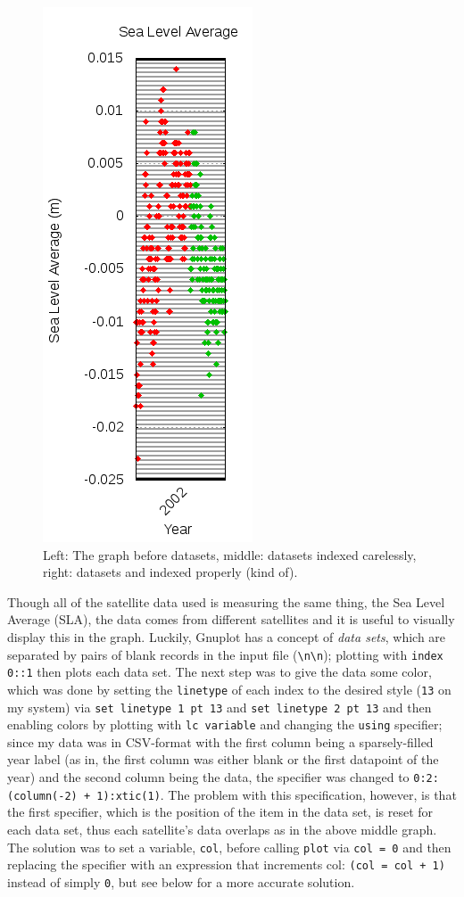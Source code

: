 \documentclass{article}
\begin{document}
\begin{figure}
\includegraphics{files/blog/2018_06_02_measuring_sea_level_averages_using_rads/2018_06_02_datasets_after.png}
\caption{Left: The graph before datasets, middle: datasets indexed carelessly, right: datasets and indexed properly (kind of).}
\end{figure}
Though all of the satellite data used is measuring the same thing, the Sea Level Average (SLA), the data comes from different satellites and it is useful to visually display this in the graph.  Luckily, Gnuplot has a concept of \emph{data sets}, which are separated by pairs of blank records in the input file (\verb$\n\n$); plotting with \texttt{index 0::1} then plots each data set.  The next step was to give the data some color, which was done by setting the \texttt{linetype} of each index to the desired style (\texttt{13} on my system) via \texttt{set linetype 1 pt 13} and \texttt{set linetype 2 pt 13} and then enabling colors by plotting with \texttt{lc variable} and changing the \texttt{using} specifier; since my data was in CSV-format with the first column being a sparsely-filled year label (as in, the first column was either blank or the first datapoint of the year) and the second column being the data, the specifier was changed to \texttt{0:2:(column(-2) + 1):xtic(1)}.  The problem with this specification, however, is that the first specifier, which is the position of the item in the data set, is reset for each data set, thus each satellite's data overlaps as in the above middle graph.  The solution was to set a variable, \texttt{col}, before calling \texttt{plot} via \texttt{col = 0} and then replacing the specifier with an expression that increments col: \texttt{(col = col + 1)} instead of simply \texttt{0}, but see below for a more accurate solution.
\end{document}
